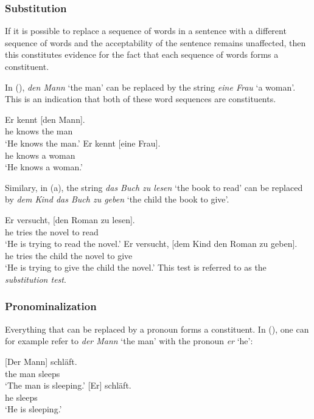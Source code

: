 \subsubsection{Substitution}

If it is possible to replace a sequence of words in a sentence with a different sequence of words and the acceptability of the sentence 
remains unaffected, then this constitutes evidence for the fact that each sequence of words forms a constituent.

In (), \emph{den Mann} `the man' can be replaced by the string \emph{eine Frau} `a woman'. This is an indication that both of
these word sequences are constituents. 

\eal
\ex 
\gll Er kennt [den Mann].\\
     he knows \spacebr{}the man\\
\glt `He knows the man.'
\ex 
\gll Er kennt [eine Frau].\\
     he knows \spacebr{}a woman\\
\glt `He knows a woman.'
\zl

\noindent
Similary, in (a), the string \emph{das Buch zu lesen} `the book to read' can be replaced
by \emph{dem Kind das Buch zu geben} `the child the book to give'.

\eal
\ex\label{ex-den-Roman-zu-lesen} 
\gll Er versucht, [den Roman zu lesen].\\
     he tries \spacebr{}the novel to read\\
\glt `He is trying to read the novel.'
\ex 
\gll Er versucht, [dem Kind den Roman zu geben].\\
     he tries \spacebr{}the child the novel to give\\
\glt `He is trying to give the child the novel.'
\zl
%
This test is referred to as the \emph{substitution test}.


\subsubsection{Pronominalization}

Everything that can be replaced by a pronoun forms a constituent.
In (), one can for example refer to \emph{der Mann} `the man' with the pronoun \emph{er} `he':

\eal
\ex 
\gll {}[Der Mann] schläft.\\
	 {}\spacebr{}the man sleeps\\
\glt `The man is sleeping.'
\ex 
\gll {}[Er] schläft.\\
     \spacebr{}he sleeps\\
\glt `He is sleeping.'
\zl

